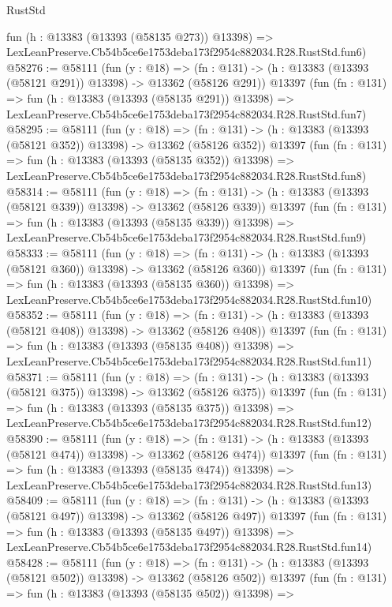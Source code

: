 \begin{lexlean}{RustStd}
\begin{coremodule}
    fun (h : @13383 (@13393 (@58135 @273)) @13398) =>
    LexLeanPreserve.Cb54b5ce6e1753deba173f2954c882034.R28.RustStd.fun6)
@58276 := @58111
    (fun (y : @18) =>
    (fn : @131) -> (h : @13383 (@13393 (@58121 @291)) @13398) -> @13362 (@58126 @291))
    @13397
    (fun (fn : @131) =>
    fun (h : @13383 (@13393 (@58135 @291)) @13398) =>
    LexLeanPreserve.Cb54b5ce6e1753deba173f2954c882034.R28.RustStd.fun7)
@58295 := @58111
    (fun (y : @18) =>
    (fn : @131) -> (h : @13383 (@13393 (@58121 @352)) @13398) -> @13362 (@58126 @352))
    @13397
    (fun (fn : @131) =>
    fun (h : @13383 (@13393 (@58135 @352)) @13398) =>
    LexLeanPreserve.Cb54b5ce6e1753deba173f2954c882034.R28.RustStd.fun8)
@58314 := @58111
    (fun (y : @18) =>
    (fn : @131) -> (h : @13383 (@13393 (@58121 @339)) @13398) -> @13362 (@58126 @339))
    @13397
    (fun (fn : @131) =>
    fun (h : @13383 (@13393 (@58135 @339)) @13398) =>
    LexLeanPreserve.Cb54b5ce6e1753deba173f2954c882034.R28.RustStd.fun9)
@58333 := @58111
    (fun (y : @18) =>
    (fn : @131) -> (h : @13383 (@13393 (@58121 @360)) @13398) -> @13362 (@58126 @360))
    @13397
    (fun (fn : @131) =>
    fun (h : @13383 (@13393 (@58135 @360)) @13398) =>
    LexLeanPreserve.Cb54b5ce6e1753deba173f2954c882034.R28.RustStd.fun10)
@58352 := @58111
    (fun (y : @18) =>
    (fn : @131) -> (h : @13383 (@13393 (@58121 @408)) @13398) -> @13362 (@58126 @408))
    @13397
    (fun (fn : @131) =>
    fun (h : @13383 (@13393 (@58135 @408)) @13398) =>
    LexLeanPreserve.Cb54b5ce6e1753deba173f2954c882034.R28.RustStd.fun11)
@58371 := @58111
    (fun (y : @18) =>
    (fn : @131) -> (h : @13383 (@13393 (@58121 @375)) @13398) -> @13362 (@58126 @375))
    @13397
    (fun (fn : @131) =>
    fun (h : @13383 (@13393 (@58135 @375)) @13398) =>
    LexLeanPreserve.Cb54b5ce6e1753deba173f2954c882034.R28.RustStd.fun12)
@58390 := @58111
    (fun (y : @18) =>
    (fn : @131) -> (h : @13383 (@13393 (@58121 @474)) @13398) -> @13362 (@58126 @474))
    @13397
    (fun (fn : @131) =>
    fun (h : @13383 (@13393 (@58135 @474)) @13398) =>
    LexLeanPreserve.Cb54b5ce6e1753deba173f2954c882034.R28.RustStd.fun13)
@58409 := @58111
    (fun (y : @18) =>
    (fn : @131) -> (h : @13383 (@13393 (@58121 @497)) @13398) -> @13362 (@58126 @497))
    @13397
    (fun (fn : @131) =>
    fun (h : @13383 (@13393 (@58135 @497)) @13398) =>
    LexLeanPreserve.Cb54b5ce6e1753deba173f2954c882034.R28.RustStd.fun14)
@58428 := @58111
    (fun (y : @18) =>
    (fn : @131) -> (h : @13383 (@13393 (@58121 @502)) @13398) -> @13362 (@58126 @502))
    @13397
    (fun (fn : @131) =>
    fun (h : @13383 (@13393 (@58135 @502)) @13398) =>

\end{coremodule}
\end{lexlean}
